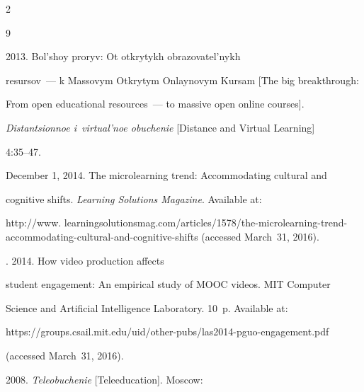   \begin{multicols}{2}





\renewcommand{\bibname}{\protect\rmfamily References}







{\small\frenchspacing


 {%




 \begin{thebibliography}{9}




 2013. Bol'shoy proryv: Ot otkrytykh obrazovatel'nykh 


resursov~--- k Massovym Otkrytym Onlaynovym Kursam [The big breakthrough: 


From open educational resources~--- to massive open online courses]. 


\textit{Distantsionnoe i~virtual'noe obuchenie} [Distance and Virtual Learning]  


4:35--47.




 December 1, 2014. The microlearning trend: Accommodating cultural and 


cognitive shifts. \textit{Learning Solutions Magazine}.  Available at: 


{\sf http://www. learningsolutionsmag.com/articles/1578/the-microlearning-trend-accommodating-cultural-and-cognitive-shifts} (accessed March~31, 2016).




. 2014. How video production affects 


student engagement: An empirical study of MOOC videos. MIT Computer 


Science and Artificial Intelligence Laboratory. 10~p. Available at: {\sf 


https://groups.csail.mit.edu/uid/other-pubs/las2014-pguo-engagement.pdf} 


(accessed March~31, 2016).




 2008. \textit{Teleobuchenie} [Teleeducation]. Moscow: 



\end{thebibliography}}}
\end{multicols}
